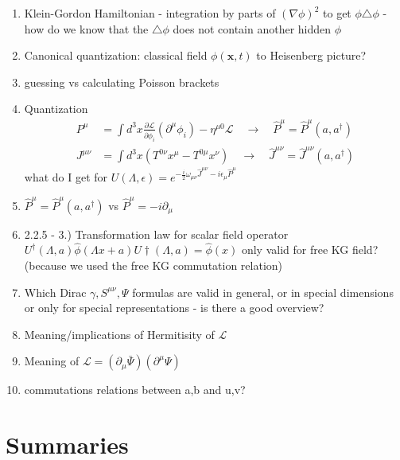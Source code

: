 \documentclass[10pt,a4paper]{report}
\theoremstyle{definition}
\begin{document}
\begin{enumerate}
\item Klein-Gordon Hamiltonian - integration by parts of $(\nabla\phi)^2$ to get $\phi\triangle\phi$ - how do we know that the $\triangle\phi$ does not contain another hidden $\phi$
\item Canonical quantization: classical field $\phi(\mathbf{x},t)$ to Heisenberg picture? 
\item guessing vs calculating Poisson brackets
\item Quantization
\begin{align}
P^\mu
&=\int d^3 x \frac{\partial\mathcal{L}}{\partial\dot{\phi}_i}(\partial^\mu\phi_i)-\eta^{\mu0}\mathcal{L}\quad\rightarrow\quad\hat{P}^\mu=\hat{P}^\mu(a,a^\dagger)\\
J^{\mu\nu}
&=\int d^3 x (T^{0\nu}x^\mu-T^{0\mu}x^\nu)\quad\rightarrow\quad\hat{J}^{\mu\nu}=\hat{J}^{\mu\nu}(a,a^\dagger)
\end{align}
what do I get for $U(\Lambda,\epsilon)=e^{-\frac{i}{2}\omega_{\mu\nu}\hat{J}^{\mu\nu}-i\epsilon_\mu\hat{P}^\mu}$
\item $\hat{P}^\mu=\hat{P}^\mu(a,a^\dagger)$ vs $\hat{P}^\mu=-i\partial_\mu$
\item 2.2.5 - 3.) Transformation law for scalar field operator $U^\dagger(\Lambda,a)\hat{\phi}(\Lambda x +a)U\dagger(\Lambda,a)=\hat{\phi}(x)$
only valid for free KG field? (because we used the free KG commutation relation)
\item Which Dirac $\gamma, S^{\mu\nu}, \Psi$ formulas are valid in general, or in special dimensions or only for special representations - is there a good overview?
\item Meaning/implications of Hermitisity of $\mathcal{L}$
\item Meaning of $\mathcal{L}=(\partial_\mu\bar{\Psi})(\partial^\mu\Psi)$
\item commutations relations between a,b and u,v?

\end{enumerate}

\chapter{Summaries}
\end{document}
